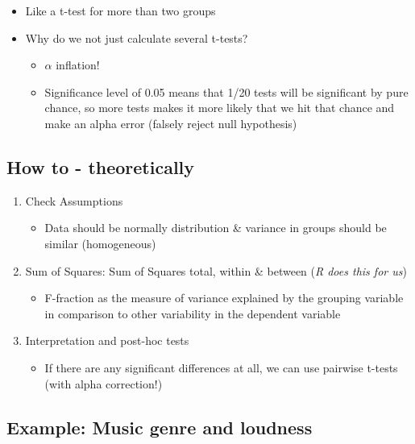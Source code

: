 \documentclass[
]{book}
\providecommand{\tightlist}{%
  \setlength{\itemsep}{0pt}\setlength{\parskip}{0pt}}
\begin{document}
\begin{itemize}
\tightlist
\item
  Like a t-test for more than two groups
\item
  Why do we not just calculate several t-tests?

  \begin{itemize}
  \tightlist
  \item
    \(\alpha\) inflation!
  \item
    Significance level of 0.05 means that 1/20 tests will be significant by pure chance, so more tests makes it more likely that we hit that chance and make an alpha error (falsely reject null hypothesis)
  \end{itemize}
\end{itemize}

\subsection{How to - theoretically}\label{how-to---theoretically}

\begin{enumerate}
\def\labelenumi{\arabic{enumi}.}
\tightlist
\item
  Check Assumptions

  \begin{itemize}
  \tightlist
  \item
    Data should be normally distribution \& variance in groups should be similar (homogeneous)
  \end{itemize}
\item
  Sum of Squares: Sum of Squares total, within \& between (\emph{R does this for us})

  \begin{itemize}
  \tightlist
  \item
    F-fraction as the measure of variance explained by the grouping variable in comparison to other variability in the dependent variable
  \end{itemize}
\item
  Interpretation and post-hoc tests

  \begin{itemize}
  \tightlist
  \item
    If there are any significant differences at all, we can use pairwise t-tests (with alpha correction!)
  \end{itemize}
\end{enumerate}

\subsection*{\texorpdfstring{Example: Music genre and loudness }{Example: Music genre and loudness }}\label{example-music-genre-and-loudness}
\end{document}
